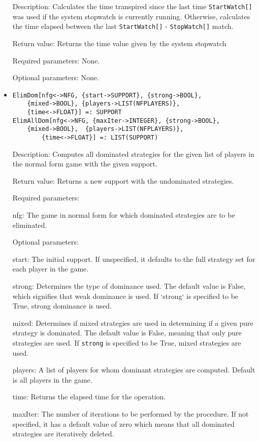 \begin{itemize}
\bd
\item
[Description:] Calculates the time transpired since the last time
\verb+StartWatch[]+ was used if the system stopwatch is currently running.
Otherwise, calculates the time elapsed between the last
\verb+StartWatch[]+ - \verb+StopWatch[]+ match.
\item
[Return value:] Returns the time value given by the system stopwatch
\item
[Required parameters:] None.
\item   
[Optional parameters:] None.
\ed

\item
\protect \large \begin{verbatim}
ElimDom[nfg<->NFG, {start->SUPPORT}, {strong->BOOL}, 
	{mixed->BOOL}, {players->LIST(NFPLAYERS)}, 
	{time<->FLOAT}] =: SUPPORT
ElimAllDom[nfg<->NFG, {maxIter->INTEGER}, {strong->BOOL}, 
	{mixed->BOOL},	{players->LIST(NFPLAYERS)},
        {time<->FLOAT}] =: LIST(SUPPORT)
\end{verbatim} \normalsize

\bd
\item
[Description:] Computes all dominated strategies for the given list of
players in the normal form game with the given support.  
\item  
[Return value:] Returns a new support with the undominated strategies.

\item
[Required parameters:]\hfill\null 
\bd
\item
[nfg:] The game in normal form for which dominated strategies are to
be eliminated.
\ed	
\item
[Optional parameters:]\hfil\null

\bd
\item
[start:] The initial support.  If unspecified, it defaults to the full
strategy set for each player in the game.  
\item
[strong:] Determines the type of dominance used.  The default value is
False, which signifies that weak dominance is used.  If `strong` is
specified to be True, strong dominance is used.
\item
[mixed:] Determines if mixed strategies are used in determining if a
given pure strategy is dominated.  The default value is False, meaning
that only pure strategies are used. If \verb+strong+ is specified to
be True, mixed strategies are used.
\item
[players:] A list of players for whom dominant strategies are
computed.  Default is all players in the game.  
\item
[time:] Returns the elapsed time for the operation.
\item
[maxIter:] The number of iterations to be performed by the procedure.  If
not specified, it has a default value of zero which means that all
dominated strategies are iteratively deleted.
\ed
\ed


\end{itemize}
